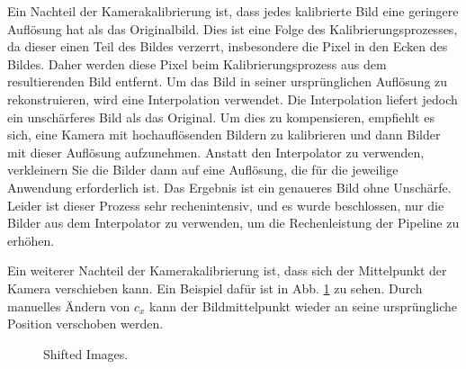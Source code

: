 \documentclass[arbeit=studie,oneside,BCOR=12mm]{ArbeitRST}
\begin{document}
Ein Nachteil der Kamerakalibrierung ist, dass jedes kalibrierte Bild eine
geringere Auflösung hat als das Originalbild. Dies ist eine Folge des
Kalibrierungsprozesses, da dieser einen Teil des Bildes verzerrt,
insbesondere die Pixel in den Ecken des Bildes. Daher werden diese Pixel beim
Kalibrierungsprozess aus dem resultierenden Bild entfernt. Um das Bild in
seiner ursprünglichen Auflösung zu rekonstruieren, wird eine Interpolation
verwendet. Die Interpolation liefert jedoch ein unschärferes Bild als das
Original. Um dies zu kompensieren, empfiehlt es sich, eine Kamera mit
hochauflösenden Bildern zu kalibrieren und dann Bilder mit dieser Auflösung
aufzunehmen. Anstatt den Interpolator zu verwenden, verkleinern Sie die Bilder
dann auf eine Auflösung, die für die jeweilige Anwendung erforderlich ist.  Das
Ergebnis ist ein genaueres Bild ohne Unschärfe. Leider ist dieser Prozess sehr
rechenintensiv, und es wurde beschlossen, nur die Bilder aus dem Interpolator
zu verwenden, um die Rechenleistung der Pipeline zu erhöhen.

Ein weiterer Nachteil der Kamerakalibrierung ist, dass sich der Mittelpunkt der
Kamera verschieben kann. Ein Beispiel dafür ist in Abb. \ref{shifted} zu sehen. Durch
manuelles Ändern von $c_x$ kann der Bildmittelpunkt wieder an seine
ursprüngliche Position verschoben werden. 

\begin{figure}[h]
    \centering
    \caption{Shifted Images.}
    \label{shifted}
\end{figure}
\end{document}
